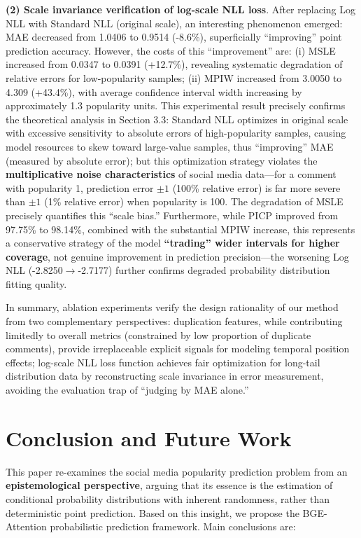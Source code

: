 \documentclass[10pt]{article}
\begin{document}
\textbf{(2) Scale invariance verification of log-scale NLL loss}. After replacing Log NLL with Standard NLL (original scale), an interesting phenomenon emerged: MAE decreased from 1.0406 to 0.9514 (-8.6\%), superficially ``improving'' point prediction accuracy. However, the costs of this ``improvement'' are: (i) MSLE increased from 0.0347 to 0.0391 (+12.7\%), revealing systematic degradation of relative errors for low-popularity samples; (ii) MPIW increased from 3.0050 to 4.309 (+43.4\%), with average confidence interval width increasing by approximately 1.3 popularity units. This experimental result precisely confirms the theoretical analysis in Section 3.3: Standard NLL optimizes in original scale with excessive sensitivity to absolute errors of high-popularity samples, causing model resources to skew toward large-value samples, thus ``improving'' MAE (measured by absolute error); but this optimization strategy violates the \textbf{multiplicative noise characteristics} of social media data---for a comment with popularity 1, prediction error $\pm 1$ (100\% relative error) is far more severe than $\pm 1$ (1\% relative error) when popularity is 100. The degradation of MSLE precisely quantifies this ``scale bias.'' Furthermore, while PICP improved from 97.75\% to 98.14\%, combined with the substantial MPIW increase, this represents a conservative strategy of the model \textbf{``trading'' wider intervals for higher coverage}, not genuine improvement in prediction precision---the worsening Log NLL (-2.8250$\to$-2.7177) further confirms degraded probability distribution fitting quality.

In summary, ablation experiments verify the design rationality of our method from two complementary perspectives: duplication features, while contributing limitedly to overall metrics (constrained by low proportion of duplicate comments), provide irreplaceable explicit signals for modeling temporal position effects; log-scale NLL loss function achieves fair optimization for long-tail distribution data by reconstructing scale invariance in error measurement, avoiding the evaluation trap of ``judging by MAE alone.''

\section{Conclusion and Future Work}

This paper re-examines the social media popularity prediction problem from an \textbf{epistemological perspective}, arguing that its essence is the estimation of conditional probability distributions with inherent randomness, rather than deterministic point prediction. Based on this insight, we propose the BGE-Attention probabilistic prediction framework. Main conclusions are:
\end{document}
